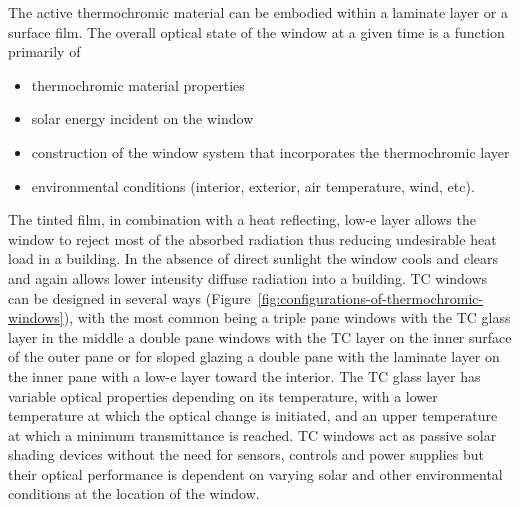 The active thermochromic material can be embodied within a laminate layer or a surface film. The overall optical state of the window at a given time is a function primarily of

\begin{itemize}
\item
  thermochromic material properties
\item
  solar energy incident on the window
\item
  construction of the window system that incorporates the thermochromic layer
\item
  environmental conditions (interior, exterior, air temperature, wind, etc).
\end{itemize}

The tinted film, in combination with a heat reflecting, low-e layer allows the window to reject most of the absorbed radiation thus reducing undesirable heat load in a building. In the absence of direct sunlight the window cools and clears and again allows lower intensity diffuse radiation into a building. TC windows can be designed in several ways (Figure~\ref{fig:configurations-of-thermochromic-windows}), with the most common being a triple pane windows with the TC glass layer in the middle a double pane windows with the TC layer on the inner surface of the outer pane or for sloped glazing a double pane with the laminate layer on the inner pane with a low-e layer toward the interior. The TC glass layer has variable optical properties depending on its temperature, with a lower temperature at which the optical change is initiated, and an upper temperature at which a minimum transmittance is reached. TC windows act as passive solar shading devices without the need for sensors, controls and power supplies but their optical performance is dependent on varying solar and other environmental conditions at the location of the window.


